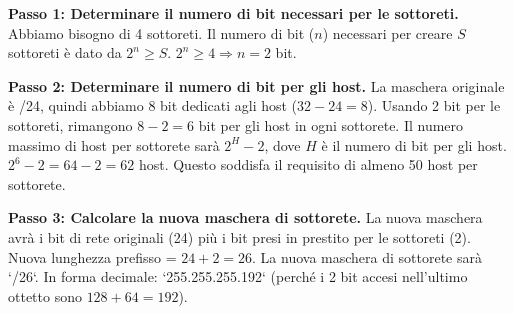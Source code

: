 \textbf{Passo 1: Determinare il numero di bit necessari per le sottoreti.}
Abbiamo bisogno di 4 sottoreti. Il numero di bit ($n$) necessari per creare $S$ sottoreti è dato da $2^n \ge S$.
$2^n \ge 4 \Rightarrow n=2$ bit.

\textbf{Passo 2: Determinare il numero di bit per gli host.}
La maschera originale è /24, quindi abbiamo 8 bit dedicati agli host ($32 - 24 = 8$).
Usando 2 bit per le sottoreti, rimangono $8 - 2 = 6$ bit per gli host in ogni sottorete.
Il numero massimo di host per sottorete sarà $2^H - 2$, dove $H$ è il numero di bit per gli host.
$2^6 - 2 = 64 - 2 = 62$ host. Questo soddisfa il requisito di almeno 50 host per sottorete.

\textbf{Passo 3: Calcolare la nuova maschera di sottorete.}
La nuova maschera avrà i bit di rete originali (24) più i bit presi in prestito per le sottoreti (2).
Nuova lunghezza prefisso = $24 + 2 = 26$.
La nuova maschera di sottorete sarà `/26`.
In forma decimale: `255.255.255.192` (perché i 2 bit accesi nell'ultimo ottetto sono $128 + 64 = 192$).

